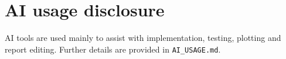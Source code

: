 \section*{AI usage disclosure}
AI tools are used mainly to assist with implementation, testing, plotting and
report editing. Further details are provided in \texttt{AI\_USAGE.md}.
